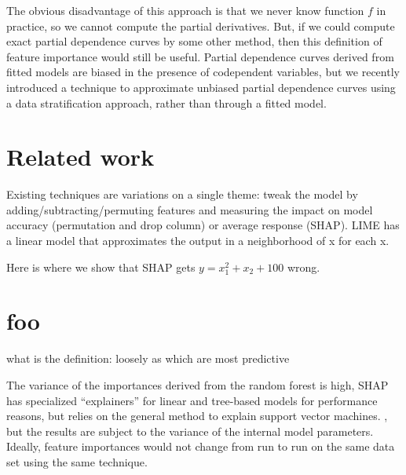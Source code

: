 \documentclass[12pt]{article}
\newcommand{\todo}[1]{{{\color{red}{[#1]}}}}
\begin{document}
\todo{Do we have to consider the area under the partial dependence curves or just the average impact?}

The obvious disadvantage of this approach is that we never know function $f$ in practice, so we cannot compute the partial derivatives. But, if we could  compute exact partial dependence curves by some other method, then this definition of feature importance would still be useful. Partial dependence curves derived from fitted models are biased in the presence of codependent variables, but we recently introduced a technique to approximate unbiased partial dependence curves using a data stratification approach, rather than through a fitted model.

\section{Related work}

Existing techniques are variations on a single theme: tweak the model by adding/subtracting/permuting features and measuring the impact on model accuracy (permutation and drop column) or average response (SHAP). LIME has a linear model that approximates the output in a neighborhood of x for each x.

Here is where we show that SHAP gets $y = x_1^2 + x_2 + 100$ wrong.
 
\section{foo}

 what is the definition: loosely as which are most predictive

The variance of the importances derived from the random forest is high, SHAP has specialized ``explainers'' for linear and tree-based models for performance reasons, but relies on the general method to explain support vector machines. , but the results are subject to the variance of the internal model parameters.  Ideally, feature importances would not change from run to run on the same data set using the same technique.




\end{document}
